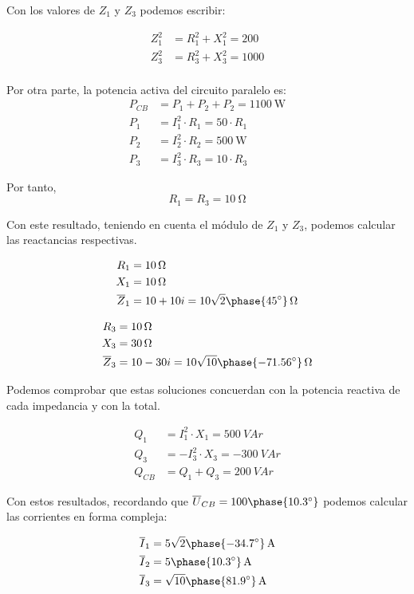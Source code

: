 Con los valores de $Z_1$ y $Z_3$ podemos escribir:

\begin{align*}
  Z_1^2 &= R_1^2 + X_1^2 = 200\\
  Z_3^2 &= R_3^2 + X_3^2 = 1000\\
\end{align*}

Por otra parte, la potencia activa del circuito paralelo es:
\begin{align*}
  P_{CB} &= P_1 + P_2 + P_2 =\qty{1100}{\watt}\\
  P_1 &= I_1^2 \cdot R_1 = 50 \cdot R_1\\
  P_2 &= I_2^2 \cdot R_2 = \qty{500}{\watt}\\
  P_3 &= I_3^2 \cdot R_3 = 10 \cdot R_3
\end{align*}

Por tanto, 
\[
   R_1 = R_3 = \qty{10}{\ohm}              
\]

Con este resultado, teniendo en cuenta el módulo de $Z_1$ y $Z_3$,
podemos calcular las reactancias respectivas.

\begin{align*}
  R_1 &= \qty{10}{\ohm}\\
  X_1 &= \qty{10}{\ohm}\\
  \overline{Z}_1 &= 10 + 10i = \qty[parse-numbers=false]{10\sqrt{2}\phase{\ang{45}}}{\ohm}
\end{align*}

\begin{align*}
  R_3 &= \qty{10}{\ohm}\\
  X_3 &= \qty{30}{\ohm}\\
  \overline{Z}_3 &= 10 - 30i = \qty[parse-numbers=false]{10\sqrt{10}\phase{\ang{-71.56}}}{\ohm}
\end{align*}

Podemos comprobar que estas soluciones concuerdan con la potencia
reactiva de cada impedancia y con la total.

\begin{align*}
  Q_1 &= I_1^2 \cdot X_1 = \qty{500}{VA}r\\
  Q_3 &= - I_3^2 \cdot X_3 = \qty{-300}{VA}r\\
  Q_{CB} &= Q_1 + Q_3 =\qty{200}{VA}r
\end{align*}

Con estos resultados, recordando que  $\overline{U}_{CB} =
100\phase{\ang{10.3}}$ podemos calcular las corrientes en forma
compleja:

\begin{align*}
  \overline{I}_1 &=  \qty[parse-numbers=false]{5\sqrt{2}\phase{\ang{-34.7}}}{\ampere}\\
  \overline{I}_2 &=  \qty[parse-numbers=false]{5\phase{\ang{10.3}}}{\ampere}\\
  \overline{I}_3 &=
  \qty[parse-numbers=false]{\sqrt{10}\phase{\ang{81.9}}}{\ampere}
\end{align*}

